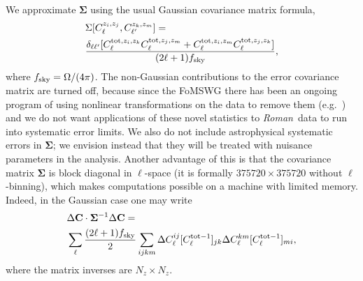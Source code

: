 \documentclass[usenatbib]{mnras}
\newcommand{\wfirst}{{\slshape Roman}}
\begin{document}
We approximate ${\boldsymbol\Sigma}$ using the usual Gaussian
covariance matrix formula,
\begin{align}
&\Sigma[C^{z_i,z_j}_\ell, C^{z_k,z_m}_{\ell'}]= \nonumber\\
& \frac{\delta_{\ell\ell'} [ C^{{\rm tot},z_i,z_k}_\ell C^{{\rm tot},z_j,z_m}_\ell + C^{{\rm tot},z_i,z_m}_\ell C^{{\rm tot},z_j,z_k}_\ell]}{(2\ell+1)f_{\rm sky}} ,
\label{eq:SGauss}
\end{align}
where $f_{\rm sky} = \Omega/(4\pi)$.  The non-Gaussian contributions
to the error covariance matrix are turned off, because since the
FoMSWG \citep{2009arXiv0901.0721A} there has been an ongoing program of
using nonlinear transformations on the data to remove them (e.g.\
\cite{2009ApJ...698L..90N, 2011ApJ...729L..11S}) and
we do not want applications of these novel statistics to \wfirst\ data
to run into systematic error limits. We also do not include astrophysical systematic errors in ${\boldsymbol\Sigma}$; we envision instead that they will be treated with nuisance parameters in the analysis. Another advantage of this is that the covariance matrix ${\boldsymbol\Sigma}$ is block diagonal in $\ell$-space (it is formally $375720\times375720$ without $\ell$-binning), which makes computations possible on a machine with limited memory. Indeed, in the Gaussian case one may write
\begin{align}
&\Delta{\bf C} \cdot {\boldsymbol\Sigma}^{-1} \Delta {\bf C}=\nonumber\\
& \sum_\ell \frac{(2\ell+1)f_{\rm sky}}2 \sum_{ijkm}
 \Delta C_\ell^{ij} [C^{{\rm tot}-1}_\ell]_{jk}
 \Delta C_\ell^{km} [C^{{\rm tot}-1}_\ell]_{mi},
\label{eq:sprodform}
\end{align}
where the matrix inverses are $N_z\times N_z$.

\begin{table}
\caption{The effective number density in each redshift bin, in units of galaxies/arcmin$^{2}$, used for setting requirements. These are {\em per bin}, i.e.\ are $dn_{\rm eff}/dz\times\Delta z$. 
\label{tab:dNdz}}
\end{table}
\end{document}
